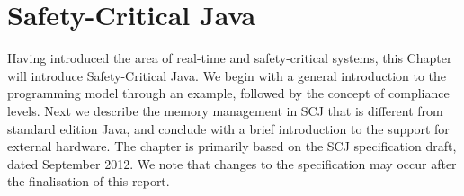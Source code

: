 \chapter{Safety-Critical Java}
\label{chapter:scj}
Having introduced the area of real-time and safety-critical systems, this Chapter will introduce Safety-Critical Java. We begin with a general introduction to the programming model through an example, followed by the concept of compliance levels. Next we describe the memory management in SCJ that is different from standard edition Java, and conclude with a brief introduction to the support for external hardware.
 The chapter is primarily based on the SCJ specification draft, dated September 2012\cite{SCJSpec}. We note that changes to the specification may occur after the finalisation of this report.